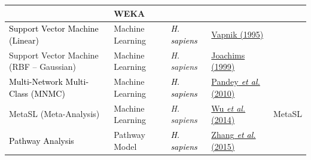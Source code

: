 \begin{table}[!ht]
{\begin{tabular}{l|l|l|l|l}
~
 &
WEKA\\\hline
\cellcolor[rgb]{0.8509804,0.8862745,0.9529412}\color{black}
\textcolor{black}{Support Vector Machine (Linear)} &
\cellcolor[rgb]{0.8509804,0.8862745,0.9529412}\color{black} Machine
Learning &
\cellcolor[rgb]{0.8509804,0.8862745,0.9529412}\color{black}
\textit{\textcolor{black}{H. sapiens}} &
\cellcolor[rgb]{0.8509804,0.8862745,0.9529412}\color{black}
\hyperlink{ENREF106}{Vapnik (1995)} &
\cellcolor[rgb]{0.8509804,0.8862745,0.9529412}~
\\\hline
Support Vector Machine (RBF -- Gaussian) &
Machine Learning &
\textit{H. sapiens} &
\hyperlink{ENREF54}{Joachims (1999)} &
~
\\\hline
\cellcolor[rgb]{0.8509804,0.8862745,0.9529412}\color{black}
\textcolor{black}{Multi-Network Multi-Class (MNMC)} &
\cellcolor[rgb]{0.8509804,0.8862745,0.9529412}\color{black} Machine
Learning &
\cellcolor[rgb]{0.8509804,0.8862745,0.9529412}\color{black}
\textit{\textcolor{black}{H. sapiens}} &
\cellcolor[rgb]{0.8509804,0.8862745,0.9529412}\color{black}
\hyperlink{ENREF79}{Pandey}\hyperlink{ENREF79}{\textit{\textcolor{black}{
et al.}}}\hyperlink{ENREF79}{ (2010)} &
\cellcolor[rgb]{0.8509804,0.8862745,0.9529412}~
\\\hline
MetaSL (Meta-Analysis) &
Machine Learning &
\textit{H. sapiens} &
\hyperlink{ENREF114}{Wu}\hyperlink{ENREF114}{\textit{ et
al.}}\hyperlink{ENREF114}{ (2014)} &
MetaSL\\\hline
\cellcolor[rgb]{0.8509804,0.8862745,0.9529412}\color{black}
\textcolor{black}{Pathway Analysis} &
\cellcolor[rgb]{0.8509804,0.8862745,0.9529412}\color{black} Pathway
Model &
\cellcolor[rgb]{0.8509804,0.8862745,0.9529412}\color{black}
\textit{\textcolor{black}{H. sapiens}} &
\cellcolor[rgb]{0.8509804,0.8862745,0.9529412}\color{black}
\hyperlink{ENREF117}{Zhang}\hyperlink{ENREF117}{\textit{\textcolor{black}{
et al.}}}\hyperlink{ENREF117}{ (2015)} &
\cellcolor[rgb]{0.8509804,0.8862745,0.9529412}~
\\\hline
\end{tabular}
}
\end{table}

